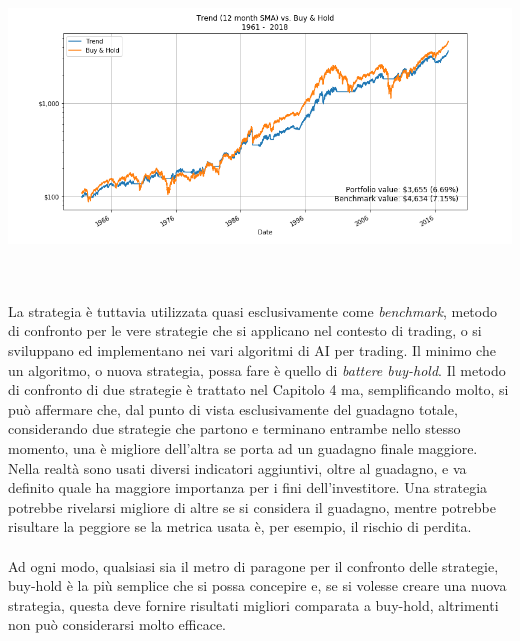 \documentclass[a4paper,12pt]{report}
\begin{document}
\begin{fig}
	\begin{center}
	\includegraphics[width=16cm]{buy_hold}
\label{Figura 3}
	\end{center}
\end{fig}
\\~\\La strategia è tuttavia utilizzata quasi esclusivamente come \textit{benchmark}, metodo di confronto per le vere strategie che si applicano nel contesto di trading, o si sviluppano ed implementano nei vari algoritmi di AI per trading. Il minimo che un algoritmo, o nuova strategia, possa fare è quello di \textit{battere buy-hold}. Il metodo di confronto di due strategie è trattato nel Capitolo 4 ma, semplificando molto, si può affermare che, dal punto di vista esclusivamente del guadagno totale, considerando due strategie che partono e terminano entrambe nello stesso momento, una è migliore dell'altra se porta ad un guadagno finale maggiore. Nella realtà sono usati diversi indicatori aggiuntivi, oltre al guadagno, e va definito quale ha maggiore importanza per i fini dell'investitore. Una strategia potrebbe rivelarsi migliore di altre se si considera il guadagno, mentre potrebbe risultare la peggiore se la metrica usata è, per esempio, il rischio di perdita.\\~\\Ad ogni modo, qualsiasi sia il metro di paragone per il confronto delle strategie, buy-hold è la più semplice che si possa concepire e, se si volesse creare una nuova strategia, questa deve fornire risultati migliori comparata a buy-hold, altrimenti non può considerarsi molto efficace.
\end{document}
